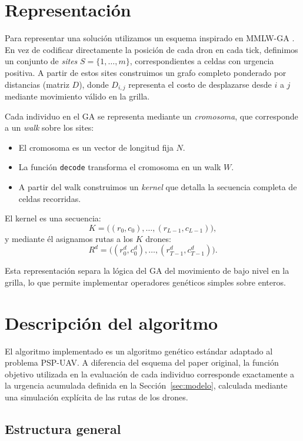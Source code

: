 \documentclass[11pt,a4paper]{article}
\begin{document}
\section{Representación}
\label{sec:representacion}

Para representar una solución utilizamos un esquema inspirado en MMLW-GA \cite{mmlwga2023}. En vez de codificar directamente la posición de cada dron en cada tick, definimos un conjunto de \emph{sites} $S = \{1,\dots,m\}$, correspondientes a celdas con urgencia positiva. A partir de estos sites construimos un grafo completo ponderado por distancias (matriz $D$), donde $D_{i,j}$ representa el costo de desplazarse desde $i$ a $j$ mediante movimiento válido en la grilla.

Cada individuo en el GA se representa mediante un \emph{cromosoma}, que corresponde a un \emph{walk} sobre los sites:
\begin{itemize}
    \item El cromosoma es un vector de longitud fija $N$.
    \item La función \texttt{decode} transforma el cromosoma en un walk $W$.
    \item A partir del walk construimos un \emph{kernel} que detalla la secuencia completa de celdas recorridas.
\end{itemize}

El kernel es una secuencia:
\[
    K = \bigl((r_0,c_0), \dots, (r_{L-1},c_{L-1})\bigr),
\]
y mediante él asignamos rutas a los $K$ drones:
\[
    R^d = \bigl((r^d_0,c^d_0), \dots, (r^d_{T-1},c^d_{T-1})\bigr).
\]

Esta representación separa la lógica del GA del movimiento de bajo nivel en la grilla, lo que permite implementar operadores genéticos simples sobre enteros.



\section{Descripción del algoritmo}
\label{sec:algoritmo}

El algoritmo implementado es un algoritmo genético estándar adaptado al problema PSP-UAV. A diferencia del esquema del paper original, la función objetivo utilizada en la evaluación de cada individuo corresponde exactamente a la urgencia acumulada definida en la Sección~\ref{sec:modelo}, calculada mediante una simulación explícita de las rutas de los drones.

\subsection{Estructura general}
\end{document}
